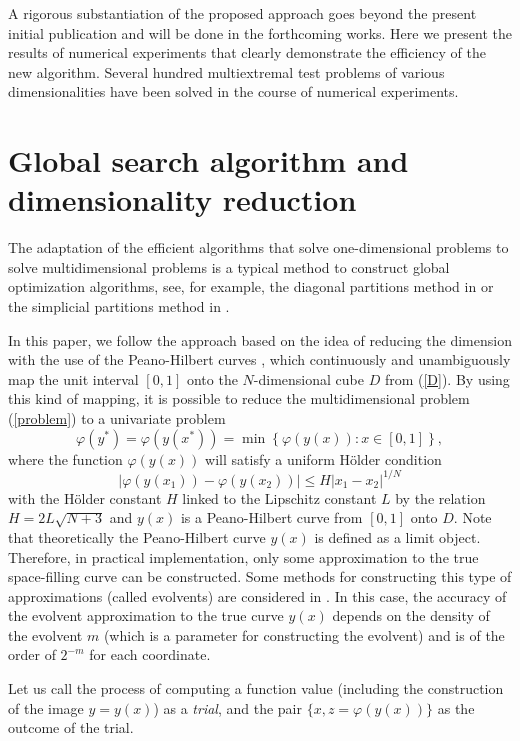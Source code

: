 \documentclass[runningheads]{llncs}
\begin{document}
A rigorous substantiation of the proposed approach goes beyond the present initial publication and will be done in the forthcoming works. Here we present the results of numerical experiments that clearly demonstrate the efficiency of the new algorithm. Several hundred multiextremal test problems of various dimensionalities have been solved in the course of numerical experiments.

\section{Global search algorithm and dimensionality reduction}

The adaptation of the efficient algorithms that solve one-dimensional problems to solve multidimensional problems is a typical method to construct global optimization algorithms, see, for example, the diagonal partitions method in \cite{Sergeyev2006} or the simplicial partitions method in \cite{Zilinskas2008}.

In this paper, we follow the approach based on the idea of reducing the dimension with the use of the Peano-Hilbert curves \cite{Sergeyev2013,Strongin2000}, which continuously and unambiguously map the unit interval $[0,1]$ onto the $N$-dimensional cube $D$ from (\ref{D}). By using this kind of mapping, it is possible to reduce the multidimensional problem (\ref{problem}) to a univariate problem
\[
\varphi(y^\ast)=\varphi(y(x^\ast))=\min{\left\{\varphi(y(x)): x\in[0,1]\right\}},
\]
where the function $\varphi(y(x))$ will satisfy a uniform H{\"o}lder condition
\[
\left|\varphi(y(x_1))-\varphi(y(x_2))\right|\leq H\left|x_1-x_2\right|^{1/N}
\]
with the H{\"o}lder constant $H$ linked to the Lipschitz constant $L$ by the relation
$ H=2 L \sqrt{N+3}$ and $y(x)$ is a Peano-Hilbert curve from $[0,1]$ onto $D$.
Note that theoretically the Peano-Hilbert curve $y(x)$ is defined as a limit object. Therefore, in practical implementation, only some approximation to the true space-filling curve can be constructed. Some methods for constructing this type of approximations (called evolvents) are considered in \cite{Sergeyev2013,Strongin2000}. In this case, the accuracy of the evolvent approximation to the true curve $y(x)$ depends on the density of the evolvent $m$ (which is a parameter for constructing the evolvent) and is of the order of $2^{-m}$ for each coordinate.

Let us call the process of computing a function value (including the construction of the image $y=y(x)$) as a \textit{trial}, and the pair $\{x, z = \varphi(y(x))\}$ as the outcome of the trial.
\end{document}
